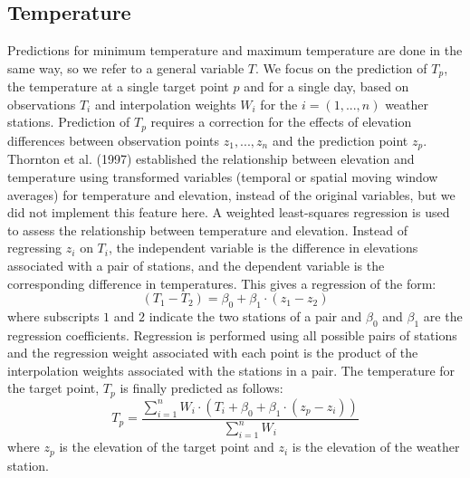\documentclass[11pt,a4paper]{article}
\begin{document}
\subsection{Temperature}
Predictions for minimum temperature and maximum temperature are done in the same way, so we refer to a general variable $T$. We focus on the prediction of $T_p$, the temperature at a single target point $p$ and for a single day, based on observations $T_i$ and interpolation weights $W_i$ for the $i = (1, ..., n)$ weather stations. Prediction of $T_p$ requires a correction for the effects of elevation differences between observation points $z_1, ..., z_n$ and the prediction point $z_p$. Thornton et al. (1997) established the relationship between elevation and temperature using transformed variables (temporal or spatial moving window averages) for temperature and elevation, instead of the original variables, but we did not implement this feature here. A weighted least-squares regression is used to assess the relationship between temperature and elevation. Instead of regressing $z_i$ on $T_i$, the independent variable is the difference in elevations associated with a pair of stations, and the dependent variable is the corresponding difference in temperatures. This gives a regression of the form:
\begin{equation}
(T_1 - T_2) = \beta_0 + \beta_1 \cdot (z_1 - z_2)
\end{equation}
where subscripts $1$ and $2$ indicate the two stations of a pair and $\beta_0$ and $\beta_1$ are the regression coefficients. Regression is performed using all possible pairs of stations and the regression weight associated with each point is the product of the interpolation weights associated with the stations in a pair. The temperature for the target point, $T_p$ is finally predicted as follows:
\begin{equation}
T_{p} = \frac{\sum_{i=1}^{n}{W_i\cdot (T_i + \beta_0 + \beta_1 \cdot(z_p - z_i))}}{\sum_{i=1}^{n}{W_i}}
\end{equation}
where $z_p$ is the elevation of the target point and $z_i$ is the elevation of the weather station.
\end{document}
